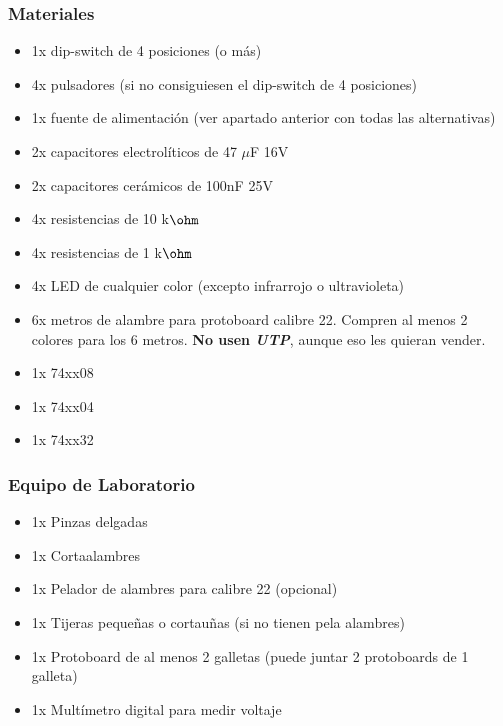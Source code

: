 \subsubsection*{Materiales}
\begin{itemize}
    \item 1x dip-switch de 4 posiciones (o más)
    \item 4x pulsadores (si no consiguiesen el dip-switch de 4 posiciones)
    \item 1x fuente de alimentación (ver apartado anterior con todas las alternativas)
    \item 2x capacitores electrolíticos de 47 $\mu$F 16V
    \item 2x capacitores cerámicos de 100nF 25V
    \item 4x resistencias de 10 k$\ohm$
    \item 4x resistencias de 1 k$\ohm$
    \item 4x LED de cualquier color (excepto infrarrojo o ultravioleta)
    \item 6x metros de alambre para protoboard calibre 22. Compren al menos 2 colores para los 6 metros. \textbf{No usen \emph{UTP}}, aunque eso les quieran vender.
    \item 1x 74xx08
    \item 1x 74xx04
    \item 1x 74xx32
\end{itemize}


\subsubsection*{Equipo de Laboratorio}
\begin{itemize}
    \item 1x Pinzas delgadas
    \item 1x Cortaalambres
    \item 1x Pelador de alambres para calibre 22 (opcional)
    \item 1x Tijeras pequeñas o cortauñas (si no tienen pela alambres)
    \item 1x Protoboard de al menos 2 galletas (puede juntar 2 protoboards de 1 galleta)
    \item 1x Multímetro digital para medir voltaje
\end{itemize}

\subsection{}